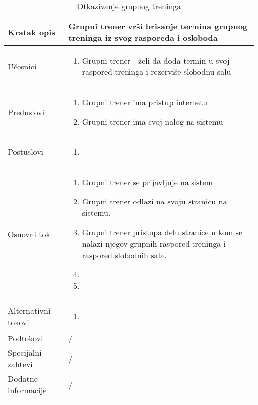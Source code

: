 \documentclass[../grupniTreninzi.tex]{subfiles}
\begin{document}
\begin{longtable}{| p{} | p{} |} 
\hline
    Kratak opis & Grupni trener vrši brisanje termina grupnog treninga iz svog rasporeda i osloboda  
    \\ 
\hline    
    Učesnici &
    \begin{enumerate}
        \item Grupni trener - želi da doda termin u svoj raspored treninga i rezerviše slobodnu salu
    \end{enumerate}\\
\hline
   Preduslovi & 
   \begin{enumerate}
        \item Grupni trener ima pristup internetu
        \item Grupni trener ima svoj nalog na sistemu
    \end{enumerate}\\
\hline  
    Postuslovi &
    \begin{enumerate}
        \item 
    \end{enumerate}\\
\hline
    Osnovni tok & 
    \begin{enumerate}
        \item Grupni trener se prijavljuje na sistem
        \item Grupni trener odlazi na svoju stranicu na sistemu.
        \item Grupni trener pristupa delu stranice u kom se nalazi njegov grupnih raspored treninga i raspored slobodnih sala.
        \item 
        \item 
    \end{enumerate}\\
\hline
    Alternativni tokovi & 
       \begin{enumerate}
        \item 
    \end{enumerate}\\
\hline
    Podtokovi & /\\
\hline
    Specijalni zahtevi & /\\
\hline
    Dodatne informacije & /\\
\hline
\caption{Otkazivanje grupnog treninga} %
\end{longtable}
\end{document}
